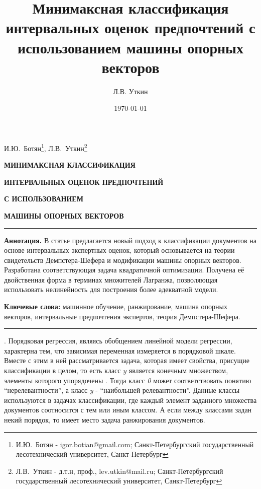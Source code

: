 \documentclass[10pt,a5paper,oneside]{article}
\title{Минимаксная классификация интервальных оценок предпочтений с использованием машины опорных векторов}
\author{Л.В. Уткин}
\date{\today}
\begin{document}

\ApplyCommonPageStyle


\centerline{И.Ю.~Ботян\footnote{И.Ю.~Ботян - igor.botian@gmail.com; Санкт-Петербургский государственный лесотехнический университет, Санкт-Петербург}, Л.В.~Уткин\footnote{Л.В.~Уткин - д.т.н, проф., lev.utkin@mail.ru; Санкт-Петербургский государственный лесотехнический университет, Санкт-Петербург}}
\centerline{\textbf{МИНИМАКСНАЯ КЛАССИФИКАЦИЯ}}
\centerline{\textbf{ИНТЕРВАЛЬНЫХ ОЦЕНОК ПРЕДПОЧТЕНИЙ }}
\centerline{\textbf{С ИСПОЛЬЗОВАНИЕМ}}
\centerline{\textbf{МАШИНЫ ОПОРНЫХ ВЕКТОРОВ}}

\vspace*{1em}
\rule{9cm}{1pt}

\par
{\footnotesize %
\textbf{Аннотация.} В статье предлагается новый подход к классификации документов на основе интервальных экспертных оценок, который основывается на теории свидетельств Демпстера-Шефера и модификации машины опорных векторов. 
Разработана соответствующая задача квадратичной оптимизации. 
Получена её двойственная форма в терминах множителей Лагранжа, позволяющая использовать нелинейность для построения более адекватной модели. %
}

\par
{\footnotesize %
\textbf{Ключевые слова:} машинное обучение, ранжирование, машина опорных векторов, интервальные предпочтения экспертов, теория Демпстера-Шефера.%
}

\rule{9cm}{1pt}
\vspace*{1em}


\par
{}. 
Порядковая регрессия, являясь обобщением линейной модели регрессии, характерна тем, что зависимая переменная измеряется в порядковой шкале. 
Вместе с этим в ней рассматривается задача, которая имеет свойства, присущие классификации в целом, то есть класс $y$ является конечным множеством, элементы которого упорядочены .
Тогда класс \emph{0} может соответствовать понятию ``нерелевантности'', а класс \emph{y} - ``наибольшей релевантности''. 
Данные классы используются в задачах классификации, где каждый элемент заданного множества документов соотносится с тем или иным классом. 
А если между классами задан некий порядок, то имеет место задача ранжирования документов. 
\end{document}
